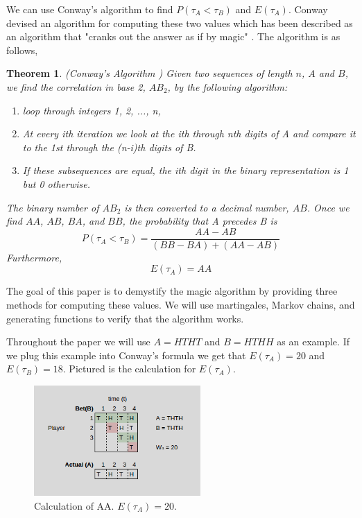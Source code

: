 \documentclass{article}
\newtheorem{theorem}{Theorem}[section]
\numberwithin{mytheorem}{subsection} %
\begin{document}
		We can use Conway's algorithm to find $P(\tau_A < \tau_B)$ and $E(\tau_A)$. Conway devised an algorithm for computing these two values which has been described as an algorithm that "cranks out the answer as if by magic" \cite{gardner}. The algorithm is as follows,

		\begin{theorem}(Conway's Algorithm \cite{gardner})
		Given two sequences of length $n$, $A$ and $B$, we find the correlation in base 2, $AB_2$, by the following algorithm:
		\begin{enumerate}
		\item loop through integers 1, 2, ..., n,
		\item At every ith iteration we look at the ith through nth digits of A and compare
		   it to the 1st through the (n-i)th digits of B.
		\item If these subsequences are equal, the ith digit in the binary representation is 1 but 0 otherwise.
		\end{enumerate} 

		The binary number of $AB_2$
		is then converted to a decimal number, $AB$. Once we find $AA$, $AB$,
		$BA$, and $BB$, the probability that A precedes B is
		$$P(\tau_A < \tau_B) = \frac{AA - AB}{(BB - BA) + (AA - AB)} $$
		Furthermore, 
		$$E(\tau_A) = AA $$ 
		\end{theorem}

		The goal of this paper is to demystify the magic algorithm by providing three methods for computing these values. We will use martingales, Markov chains, and generating functions to verify that the algorithm works.

		Throughout the paper we will use $A = HTHT$ and $B = HTHH$ as an example. If we plug this example into Conway's formula we get that $E(\tau_{A}) = 20$ and $E(\tau_{B}) = 18$. Pictured is the calculation for $E(\tau_{A})$.

		\begin{figure}[h]
			\begin{center}
				\includegraphics[width=2.5in]{AA}
			\end{center}
		
			\caption{Calculation of AA. $E(\tau_A) = 20$.}
		\label{fig}
		\end{figure}
\end{document}
